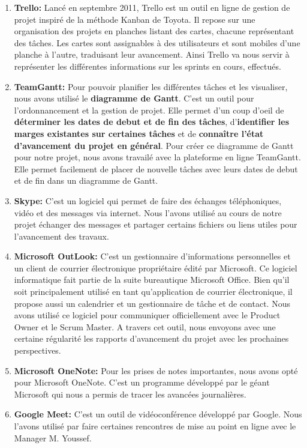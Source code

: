         \begin{enumerate}
            \item \textbf{Trello: }Lancé en septembre 2011, Trello est un outil en ligne de gestion de projet inspiré de la méthode Kanban de Toyota. Il repose sur une organisation des projets en planches listant des cartes, chacune représentant des tâches. Les cartes sont assignables à des utilisateurs et sont mobiles d'une planche à l'autre, traduisant leur avancement. Ainsi Trello va nous servir à représenter les différentes informations sur les sprints en cours, effectués.
            \item \textbf{TeamGantt: } Pour pouvoir planifier les différentes tâches et les visualiser, nous avons utilisé le \textbf{diagramme de Gantt}. C'est un outil pour l'ordonnancement et la gestion de projet. Elle permet d'un coup d'oeil de \textbf{déterminer les dates de debut et de fin des tâches}, d'\textbf{identifier les marges existantes sur certaines tâches} et de \textbf{connaître l'état d'avancement du projet en général}. Pour créer ce diagramme de Gantt pour notre projet, nous avons travailé avec la plateforme en ligne TeamGantt. Elle permet facilement de placer de nouvelle tâches avec leurs dates de debut et de fin dans un diagramme de Gantt.
            \item \textbf{Skype: }C'est un logiciel qui permet de faire des échanges téléphoniques, vidéo et des messages via internet. Nous l'avons utilisé au cours de notre projet échanger des messages et partager certains fichiers ou liens utiles pour l'avancement des travaux.
            \item \textbf{Microsoft OutLook: }C'est un gestionnaire d'informations personnelles et un client de courrier électronique propriétaire édité par Microsoft. Ce logiciel informatique fait partie de la suite bureautique Microsoft Office. Bien qu'il soit principalement utilisé en tant qu'application de courrier électronique, il propose aussi un calendrier et un gestionnaire de tâche et de contact. Nous avons utilisé ce logiciel pour communiquer officiellement avec le Product Owner et le Scrum Master. A travers cet outil, nous envoyons avec une certaine régularité les rapports d'avancement du projet avec les prochaines perspectives.
            \item \textbf{Microsoft OneNote: }Pour les prises de notes importantes, nous avons opté pour Microsoft OneNote. C'est un programme développé par le géant Microsoft qui nous a permis de tracer les avancées journalières.
            \item \textbf{Google Meet: } C'est un outil de vidéoconférence développé par Google. Nous l'avons utilisé par faire certaines rencontres de mise au point en ligne avec le Manager M. Youssef. 
        \end{enumerate}

